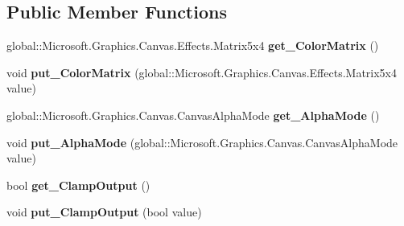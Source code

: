 \subsection*{Public Member Functions}
\begin{DoxyCompactItemize}
\item 
\mbox{\label{interface_microsoft_1_1_graphics_1_1_canvas_1_1_effects_1_1_i_color_matrix_effect_a6d1376fefa6b4c96bab74f3eaa0098a5}} 
global\+::\+Microsoft.\+Graphics.\+Canvas.\+Effects.\+Matrix5x4 {\bfseries get\+\_\+\+Color\+Matrix} ()
\item 
\mbox{\label{interface_microsoft_1_1_graphics_1_1_canvas_1_1_effects_1_1_i_color_matrix_effect_a891c719e926fd98a742b1e49dfd5e99e}} 
void {\bfseries put\+\_\+\+Color\+Matrix} (global\+::\+Microsoft.\+Graphics.\+Canvas.\+Effects.\+Matrix5x4 value)
\item 
\mbox{\label{interface_microsoft_1_1_graphics_1_1_canvas_1_1_effects_1_1_i_color_matrix_effect_a38a2f04f4c349390c6709ea86049bb00}} 
global\+::\+Microsoft.\+Graphics.\+Canvas.\+Canvas\+Alpha\+Mode {\bfseries get\+\_\+\+Alpha\+Mode} ()
\item 
\mbox{\label{interface_microsoft_1_1_graphics_1_1_canvas_1_1_effects_1_1_i_color_matrix_effect_a19111c668130b4e202fdcf1b6370de85}} 
void {\bfseries put\+\_\+\+Alpha\+Mode} (global\+::\+Microsoft.\+Graphics.\+Canvas.\+Canvas\+Alpha\+Mode value)
\item 
\mbox{\label{interface_microsoft_1_1_graphics_1_1_canvas_1_1_effects_1_1_i_color_matrix_effect_a62eb1bdc351375bda377af3d39f4407d}} 
bool {\bfseries get\+\_\+\+Clamp\+Output} ()
\item 
\mbox{\label{interface_microsoft_1_1_graphics_1_1_canvas_1_1_effects_1_1_i_color_matrix_effect_ac0b84a9c8932bab90011df716de57abc}} 
void {\bfseries put\+\_\+\+Clamp\+Output} (bool value)

\end{DoxyCompactItemize}
